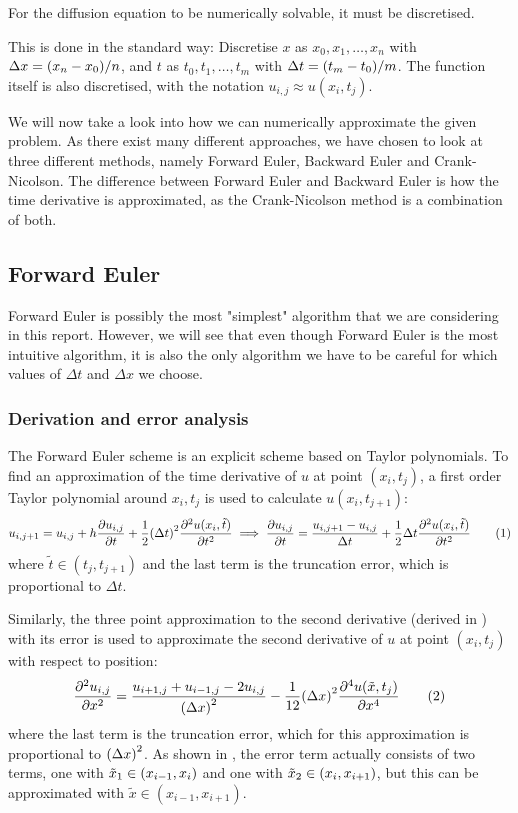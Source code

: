 \documentclass[12pt,english,a4paper]{article}
\newcommand{\eqtag}[1]{\refstepcounter{equation}\tag{\theequation}\label{#1}}
\begin{document}
For the diffusion equation to be numerically solvable, it must be discretised.

This is done in the standard way: Discretise \(x\) as \(x_0,x_1,\dots,x_n\) with \(\Delta x=\qty(x_n-x_0)/n\), and \(t\) as \(t_0,t_1,\dots,t_m\) with \(\Delta t = \qty(t_m-t_0)/m\). The function itself is also discretised, with the notation \(u_{i,j} \approx u(x_i,t_j)\).

We will now take a look into how we can numerically approximate the given problem. As there exist many different approaches, we have chosen to look at three different methods, namely Forward Euler, Backward Euler and Crank-Nicolson. The difference between Forward Euler and Backward Euler is how the time derivative is approximated, as the Crank-Nicolson method is a combination of both.
%
\subsection{Forward Euler}
Forward Euler is possibly the most "simplest" algorithm that we are considering in this report. However, we will see that even though Forward Euler is the most intuitive algorithm, it is also the only algorithm we have to be careful for which values of \(\Delta t\) and \(\Delta x\) we choose.
\subsubsection{Derivation and error analysis}\label{sec:ForwardEulerDerivation}
The Forward Euler scheme is an explicit scheme based on Taylor polynomials. To find an approximation of the time derivative of \(u\) at point \((x_i,t_j)\), a first order Taylor polynomial around \(x_i,t_j\) is used to calculate \(u(x_i,t_{j+1})\):
\[
    u_{i,j+1} = u_{i,j} + h\pdv{u_{i,j}}{t} + \frac{1}{2}\qty(\Delta t)^2\pdv[2]{u(x_i,\tilde{t})}{t}
    \implies \pdv{u_{i,j}}{t} = \frac{u_{i,j+1}-u_{i,j}}{\Delta t} + \frac{1}{2}\Delta t\pdv[2]{u(x_i,\tilde{t})}{t}\eqtag{asymmnewton}
\]
where \(\tilde{t}\in(t_j,t_{j+1})\) and the last term is the truncation error, which is proportional to \(\Delta t\).

Similarly, the three point approximation to the second derivative (derived in \autocite{oblig1}) with its error is used to approximate the second derivative of \(u\) at point \((x_i,t_j)\) with respect to position:
\[
    \pdv[2]{u_{i,j}}{x} = \frac{u_{i+1,j} + u_{i-1,j} - 2u_{i,j}}{\qty(\Delta x)^2} - \frac{1}{12}\qty(\Delta x)^2\pdv[4]{u(\tilde{x},t_j)}{x}\eqtag{andrederivert}
\]
where the last term is the truncation error, which for this approximation is proportional to \(\qty(\Delta x)^2\). As shown in \autocite{oblig1}, the error term actually consists of two terms, one with \(\tilde{x}_1\in\qty(x_{i-1},x_i)\) and one with \(\tilde{x}_2\in\qty(x_i,x_{i+1})\), but this can be approximated with \(\tilde{x}\in(x_{i-1},x_{i+1})\).
\end{document}

